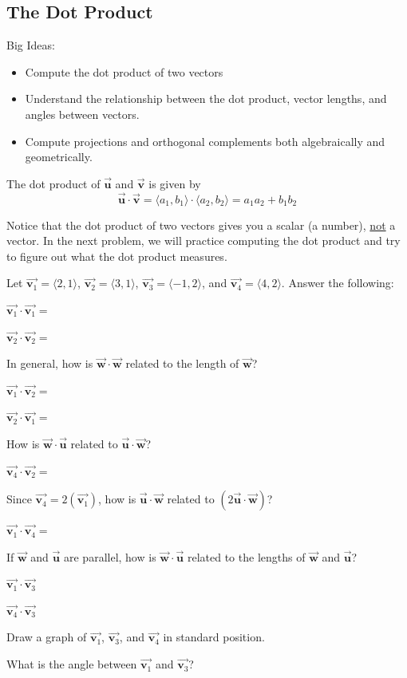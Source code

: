 \subsection{The Dot Product}
Big Ideas:
\begin{itemize}
\item Compute the dot product of two vectors
\item Understand the relationship between the dot product, vector lengths, and angles between vectors.
\item Compute projections and orthogonal complements both algebraically and geometrically.
\end{itemize}
\begin{info} The dot product of $\vec{\textbf{u}}$ and $\vec{\textbf{v}}$ is given by $$\vec{\textbf{u}} \cdot \vec{\textbf{v}} =\langle a_1,b_1\rangle \cdot \langle a_2,b_2 \rangle=a_1a_2+b_1b_2$$

Notice that the dot product of two vectors gives you a scalar (a number), \underline{not} a vector. In the next problem, we will practice computing the dot product and try to figure out what the dot product measures. \end{info}

\bq Let $\vec{\textbf{v}_1}=\langle 2,1\rangle$, $\vec{\textbf{v}_2}=\langle 3,1\rangle$, $\vec{\textbf{v}_3}=\langle -1,2\rangle$, and $\vec{\textbf{v}_4}=\langle 4,2\rangle$. Answer the following:
\be
\item $\vec{\textbf{v}_1} \cdot \vec{\textbf{v}_1}=$
\item $\vec{\textbf{v}_2} \cdot \vec{\textbf{v}_2}=$
\item In general, how is $\vec{\textbf{w}} \cdot \vec{\textbf{w}}$ related to the length of $\vec{\textbf{w}}$?
\item $\vec{\textbf{v}_1} \cdot \vec{\textbf{v}_2}=$
\item $\vec{\textbf{v}_2} \cdot \vec{\textbf{v}_1}=$
\item How is $\vec{\textbf{w}} \cdot \vec{\textbf{u}}$ related to $\vec{\textbf{u}} \cdot \vec{\textbf{w}}$?
\item $\vec{\textbf{v}_4} \cdot \vec{\textbf{v}_2}=$
\item Since $\vec{\textbf{v}_4}= 2 (\vec{\textbf{v}_1})$, how is $\vec{\textbf{u}} \cdot \vec{\textbf{w}}$ related to $(2 \vec{\textbf{u}} \cdot \vec{\textbf{w}})$?
\item $\vec{\textbf{v}_1} \cdot \vec{\textbf{v}_4}=$
\item If $\vec{\textbf{w}}$ and $\vec{\textbf{u}}$ are parallel, how is $\vec{\textbf{w}} \cdot \vec{\textbf{u}}$ related to the lengths of $\vec{\textbf{w}}$ and $\vec{\textbf{u}}$?
\item $\vec{\textbf{v}_1} \cdot \vec{\textbf{v}_3}$
\item $\vec{\textbf{v}_4} \cdot \vec{\textbf{v}_3}$
\item Draw a graph of $\vec{\textbf{v}_1}$, $\vec{\textbf{v}_3}$, and $\vec{\textbf{v}_4}$ in standard position.
\item What is the angle between $\vec{\textbf{v}_1}$ and  $\vec{\textbf{v}_3}$?
\ee
\eq

